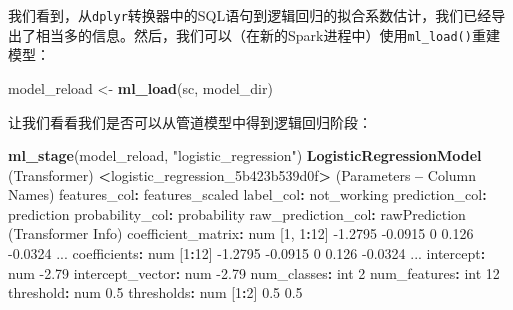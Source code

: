 \documentclass[
]{article}
\newenvironment{Shaded}{\begin{snugshade}}{\end{snugshade}}
\newcommand{\DecValTok}[1]{\textcolor[rgb]{0.00,0.00,0.81}{#1}}
\newcommand{\FloatTok}[1]{\textcolor[rgb]{0.00,0.00,0.81}{#1}}
\newcommand{\KeywordTok}[1]{\textcolor[rgb]{0.13,0.29,0.53}{\textbf{#1}}}
\newcommand{\NormalTok}[1]{#1}
\newcommand{\OperatorTok}[1]{\textcolor[rgb]{0.81,0.36,0.00}{\textbf{#1}}}
\newcommand{\StringTok}[1]{\textcolor[rgb]{0.31,0.60,0.02}{#1}}
\begin{document}
我们看到，从\texttt{dplyr}转换器中的SQL语句到逻辑回归的拟合系数估计，我们已经导出了相当多的信息。然后，我们可以（在新的Spark进程中）使用\texttt{ml\_load()}重建模型：

\begin{Shaded}
\begin{Highlighting}[]
\NormalTok{model_reload <-}\StringTok{ }\KeywordTok{ml_load}\NormalTok{(sc, model_dir)}
\end{Highlighting}
\end{Shaded}

让我们看看我们是否可以从管道模型中得到逻辑回归阶段：

\begin{Shaded}
\begin{Highlighting}[]
\KeywordTok{ml_stage}\NormalTok{(model_reload, }\StringTok{"logistic_regression"}\NormalTok{)}
\KeywordTok{LogisticRegressionModel}\NormalTok{ (Transformer)}
\OperatorTok{<}\NormalTok{logistic_regression_5b423b539d0f}\OperatorTok{>}
\StringTok{ }\NormalTok{(Parameters }\OperatorTok{--}\StringTok{ }\NormalTok{Column Names)}
\NormalTok{ features_col}\OperatorTok{:}\StringTok{ }\NormalTok{features_scaled}
\NormalTok{ label_col}\OperatorTok{:}\StringTok{ }\NormalTok{not_working}
\NormalTok{ prediction_col}\OperatorTok{:}\StringTok{ }\NormalTok{prediction}
\NormalTok{ probability_col}\OperatorTok{:}\StringTok{ }\NormalTok{probability}
\NormalTok{ raw_prediction_col}\OperatorTok{:}\StringTok{ }\NormalTok{rawPrediction}
\NormalTok{ (Transformer Info)}
\NormalTok{ coefficient_matrix}\OperatorTok{:}\StringTok{ }\NormalTok{num [}\DecValTok{1}\NormalTok{, }\DecValTok{1}\OperatorTok{:}\DecValTok{12}\NormalTok{] }\FloatTok{-1.2795} \FloatTok{-0.0915} \DecValTok{0} \FloatTok{0.126} \FloatTok{-0.0324}\NormalTok{ ...}
\NormalTok{ coefficients}\OperatorTok{:}\StringTok{ }\NormalTok{num [}\DecValTok{1}\OperatorTok{:}\DecValTok{12}\NormalTok{] }\FloatTok{-1.2795} \FloatTok{-0.0915} \DecValTok{0} \FloatTok{0.126} \FloatTok{-0.0324}\NormalTok{ ...}
\NormalTok{ intercept}\OperatorTok{:}\StringTok{ }\NormalTok{num }\FloatTok{-2.79}
\NormalTok{ intercept_vector}\OperatorTok{:}\StringTok{ }\NormalTok{num }\FloatTok{-2.79}
\NormalTok{ num_classes}\OperatorTok{:}\StringTok{ }\NormalTok{int }\DecValTok{2}
\NormalTok{ num_features}\OperatorTok{:}\StringTok{ }\NormalTok{int }\DecValTok{12}
\NormalTok{ threshold}\OperatorTok{:}\StringTok{ }\NormalTok{num }\FloatTok{0.5}
\NormalTok{ thresholds}\OperatorTok{:}\StringTok{ }\NormalTok{num [}\DecValTok{1}\OperatorTok{:}\DecValTok{2}\NormalTok{] }\FloatTok{0.5} \FloatTok{0.5}
\end{Highlighting}
\end{Shaded}
\end{document}
